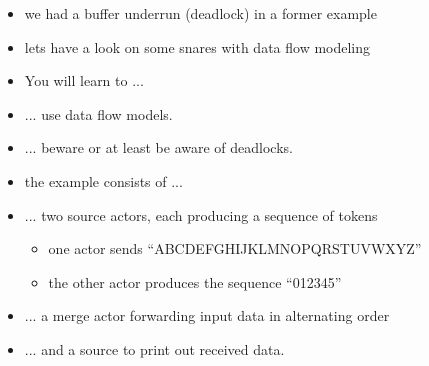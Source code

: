 \begin{frame}
\begin{itemize}
\item we had a buffer underrun (deadlock) in a former example
\item lets have a look on some snares with data flow modeling
\end{itemize}
\begin{itemize}
\item You will learn to ...
\item ... use data flow models.
\item ... beware or at least be aware of deadlocks.
\end{itemize}
\end{frame}







\begin{frame}
\begin{figure}
\centering
\resizebox{0.9\columnwidth}{!}{}
\end{figure}
\begin{itemize}
\item the example consists of ...
\item ... two source actors, each producing a sequence of tokens
\begin{itemize}
\item one actor sends ``ABCDEFGHIJKLMNOPQRSTUVWXYZ''
\item the other actor produces the sequence ``012345''
\end{itemize}
\item ... a merge actor forwarding input data in alternating order
\item ... and a source to print out received data.
\end{itemize}
\end{frame}





